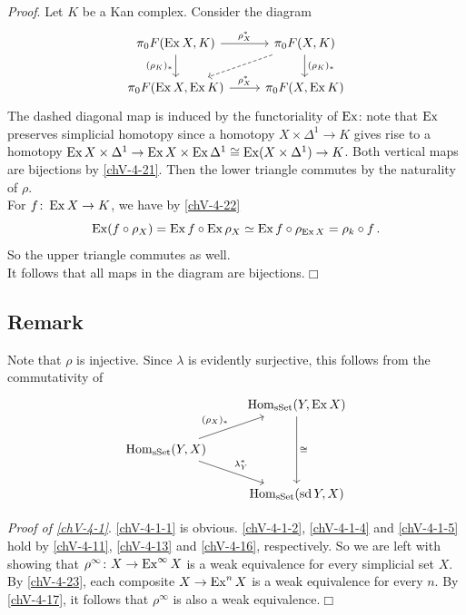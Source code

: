         \emph{Proof}. Let $K$ be a Kan complex. Consider the diagram
        \begin{equation*}
            \begin{tikzcd}
                \pi_0 F(\Ex X, K) \arrow[d, "{(\rho_K)_{*}}"'] \arrow[r, "\rho^{*}_X"] & \pi_0 F(X, K) \arrow[dl, dashed] \arrow[d, "{(\rho_K)_{*}}"] \\
                \pi_0 F(\Ex X, \Ex K) \arrow[r, "\rho^{*}_X"] & \pi_0 F(X, \Ex K)
            \end{tikzcd}
        \end{equation*}
        The dashed diagonal map is induced by the functoriality of $\operatorname{Ex}$: note that $\operatorname{Ex}$ preserves simplicial homotopy since a homotopy $X \times \Delta^1 \to K$ gives rise to a homotopy $\operatorname{Ex} X \times \Delta^1 \to \operatorname{Ex} X \times \operatorname{Ex} \Delta^1 \cong \operatorname{Ex}(X \times \Delta^1) \to K$. Both vertical maps are bijections by \ref{chV-4-21}. Then the lower triangle commutes by the naturality of $\rho$.\\
        For $f \colon \operatorname{Ex} X \to K$, we have by \ref{chV-4-22}
        \begin{equation*}
            \operatorname{Ex}(f \circ \rho_X) = \operatorname{Ex} f \circ \operatorname{Ex} \rho_X \simeq \operatorname{Ex} f \circ \rho_{\operatorname{Ex} X} = \rho_k \circ f \,.
        \end{equation*}
        So the upper triangle commutes as well.\\
        It follows that all maps in the diagram are bijections.\hfill$\Box$

    \subsection{Remark}\label{chV-4-24}
        Note that $\rho$ is injective. Since $\lambda$ is evidently surjective, this follows from the commutativity of
        \begin{equation*}
            \begin{tikzcd}
                & \Hom_{\sSet}(Y, \Ex X) \arrow[dd, "\cong"] \\
                \Hom_{\sSet}(Y, X) \arrow[ur, "{(\rho_X)_{*}}"] \arrow[dr, "\lambda^{*}_Y"] & \\
                & \Hom_{\sSet}(\sd Y, X)
            \end{tikzcd}
        \end{equation*}
        \medskip

        \emph{Proof of \ref{chV-4-1}}. \ref{chV-4-1-1} is obvious. \ref{chV-4-1-2}, \ref{chV-4-1-4} and \ref{chV-4-1-5} hold by \ref{chV-4-11}, \ref{chV-4-13} and \ref{chV-4-16}, respectively. So we are left with showing that $\rho^{\infty} \colon X \to \operatorname{Ex}^{\infty} X$ is a weak equivalence for every simplicial set $X$. By \ref{chV-4-23}, each composite $X \to \operatorname{Ex}^n X$ is a weak equivalence for every $n$. By \ref{chV-4-17}, it follows that $\rho^{\infty}$ is also a weak equivalence.\hfill$\Box$

